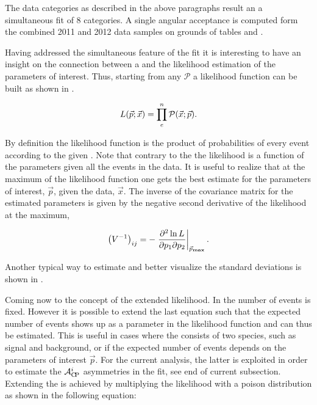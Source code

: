 The data categories as described in the above paragraphs result an a simultaneous fit of 8 categories.
A single angular acceptance is computed form the combined 2011 and 2012 data samples on grounds of
tables  and .

Having addressed the simultaneous feature of the fit it is interesting to have an insight on
the connection between a \pdf and the likelihood estimation of the parameters of interest. Thus, starting from
any \pdf $\mathcal{P}$ a likelihood function can be built as shown in .

\begin{equation}
  \centering
L(\vec{p};\vec{x}) = \prod_e^n \mathcal{P}(\vec{x};\vec{p}).
\label{likelihood}
\end{equation}

\noindent By definition the likelihood
function is the product of probabilities of every event according to the given \pdf. Note that contrary to the \pdf
the likelihood is a function of the parameters given all the events in the data. It is
useful to realize that at the maximum of the likelihood function one gets the best estimate for the parameters of
interest, $\vec{p}$, given the data, $\vec{x}$. The inverse of the covariance matrix for the estimated parameters is given
by the negative second derivative of the likelihood at the maximum,

\begin{equation}
  \centering
\left( V^{-1} \right)_{ij} = - \left. \frac{\partial^2\ln L}{\partial p_1 \partial p_2} \right|_{ \vec{p}_{\rm\bf max}}.
\label{covariance}
\end{equation}

\noindent Another typical way to estimate and better visualize the standard deviations is shown in .

Coming now to the concept of the extended likelihood. In  the number of events is fixed. However it is possible to
extend the last equation such that the expected number of events shows up as a parameter in the likelihood function and can thus be estimated.
This is useful in cases where the \pdf consists of two species, such as signal and background, or if the expected number of events depends on the
parameters of interest $\vec{p}$. For the current analysis, the latter is exploited in order to estimate the $\mathcal{A}_{\rm C\!P}^{i}$ asymmetries in the fit,
see end of current subsection. Extending the \pdf is achieved by multiplying the likelihood with a poison distribution as shown in the following equation:

